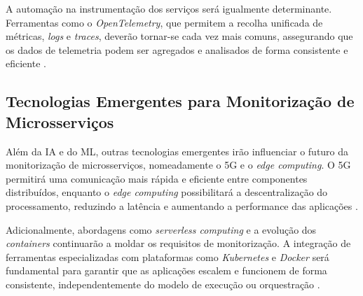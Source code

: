 A automação na instrumentação dos serviços será igualmente determinante. Ferramentas como o \textit{OpenTelemetry}, que permitem a recolha unificada de métricas, \textit{logs} e \textit{traces}, deverão tornar-se cada vez mais comuns, assegurando que os dados de telemetria podem ser agregados e analisados de forma consistente e eficiente \cite{Kusuma2022}.

\subsection{Tecnologias Emergentes para Monitorização de Microsserviços}

Além da IA e do ML, outras tecnologias emergentes irão influenciar o futuro da monitorização de microsserviços, nomeadamente o 5G e o \textit{edge computing}. O 5G permitirá uma comunicação mais rápida e eficiente entre componentes distribuídos, enquanto o \textit{edge computing} possibilitará a descentralização do processamento, reduzindo a latência e aumentando a performance das aplicações \cite{Dragoni2017}.

Adicionalmente, abordagens como \textit{serverless computing} e a evolução dos \textit{containers} continuarão a moldar os requisitos de monitorização. A integração de ferramentas especializadas com plataformas como \textit{Kubernetes} e \textit{Docker} será fundamental para garantir que as aplicações escalem e funcionem de forma consistente, independentemente do modelo de execução ou orquestração \cite{Dragoni2017}.
